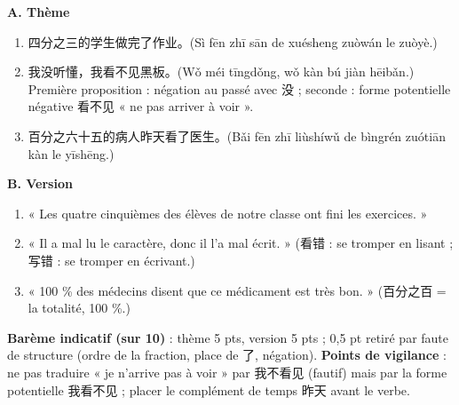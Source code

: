 \documentclass[11pt]{article}
\begin{document}
\begin{corrige}
\textbf{A. Thème}
\begin{enumerate}
\item 四分之三的学生做完了作业。(Sì fēn zhī sān de xuésheng zuòwán le zuòyè.)
\item 我没听懂，我看不见黑板。(Wǒ méi tīngdǒng, wǒ kàn bú jiàn hēibǎn.) Première proposition : négation au passé avec 没 ; seconde : forme potentielle négative 看不见 « ne pas arriver à voir ».
\item 百分之六十五的病人昨天看了医生。(Bǎi fēn zhī liùshíwǔ de bìngrén zuótiān kàn le yīshēng.)
\end{enumerate}
\textbf{B. Version}
\begin{enumerate}
\item « Les quatre cinquièmes des élèves de notre classe ont fini les exercices. »
\item « Il a mal lu le caractère, donc il l'a mal écrit. » (看错 : se tromper en lisant ; 写错 : se tromper en écrivant.)
\item « 100 \% des médecins disent que ce médicament est très bon. » (百分之百 = la totalité, 100 \%.)
\end{enumerate}
\textbf{Barème indicatif (sur 10)} : thème 5 pts, version 5 pts ; 0,5 pt retiré par faute de structure (ordre de la fraction, place de 了, négation). \textbf{Points de vigilance} : ne pas traduire « je n'arrive pas à voir » par 我不看见 (fautif) mais par la forme potentielle 我看不见 ; placer le complément de temps 昨天 avant le verbe.
\end{corrige}
\end{document}
